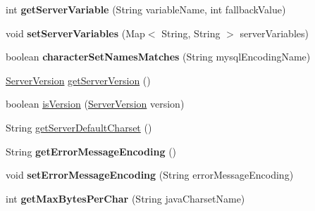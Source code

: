 \begin{DoxyCompactItemize}
int {\bfseries get\+Server\+Variable} (String variable\+Name, int fallback\+Value)
\item 
\mbox{\label{classcom_1_1mysql_1_1cj_1_1protocol_1_1x_1_1_x_server_session_affb18fb89e4799f066674d120f2c9088}} 
void {\bfseries set\+Server\+Variables} (Map$<$ String, String $>$ server\+Variables)
\item 
\mbox{\label{classcom_1_1mysql_1_1cj_1_1protocol_1_1x_1_1_x_server_session_af9937bac8e0266eeea9e7cb23a0b37d0}} 
boolean {\bfseries character\+Set\+Names\+Matches} (String mysql\+Encoding\+Name)
\item 
\mbox{\hyperlink{classcom_1_1mysql_1_1cj_1_1_server_version}{Server\+Version}} \mbox{\hyperlink{classcom_1_1mysql_1_1cj_1_1protocol_1_1x_1_1_x_server_session_a55b0588085914fbaa110c3e593efec8f}{get\+Server\+Version}} ()
\item 
boolean \mbox{\hyperlink{classcom_1_1mysql_1_1cj_1_1protocol_1_1x_1_1_x_server_session_aa121370ff7a1579fd5d7f4d653594f49}{is\+Version}} (\mbox{\hyperlink{classcom_1_1mysql_1_1cj_1_1_server_version}{Server\+Version}} version)
\item 
String \mbox{\hyperlink{classcom_1_1mysql_1_1cj_1_1protocol_1_1x_1_1_x_server_session_a7258b06a9876fde6f4ca0726a8fff500}{get\+Server\+Default\+Charset}} ()
\item 
\mbox{\label{classcom_1_1mysql_1_1cj_1_1protocol_1_1x_1_1_x_server_session_aaca8fbddd509b49577e2da35a3f52643}} 
String {\bfseries get\+Error\+Message\+Encoding} ()
\item 
\mbox{\label{classcom_1_1mysql_1_1cj_1_1protocol_1_1x_1_1_x_server_session_a8dbd15cc8a7b909c36ca095b96a06fed}} 
void {\bfseries set\+Error\+Message\+Encoding} (String error\+Message\+Encoding)
\item 
\mbox{\label{classcom_1_1mysql_1_1cj_1_1protocol_1_1x_1_1_x_server_session_a76d2f1168707f9d53d95e2d50a2a091b}} 
int {\bfseries get\+Max\+Bytes\+Per\+Char} (String java\+Charset\+Name)
\item 
\mbox{\label{classcom_1_1mysql_1_1cj_1_1protocol_1_1x_1_1_x_server_session_ad81f8d89d2f108ebfd67061ce7e1259e}} 

\end{DoxyCompactItemize}
